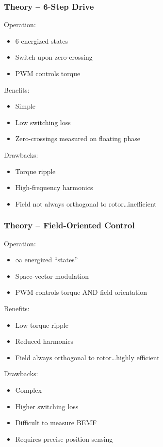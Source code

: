 \begin{frame}\frametitle{Theory -- 6-Step Drive}
	\begin{minipage}{0.6\textwidth}
		Operation:
		\begin{itemize}
			\item 6 energized states
			\item Switch upon zero-crossing
			\item PWM controls torque
		\end{itemize}
		Benefits:
		\begin{itemize}
			\item Simple
			\item Low switching loss
			\item Zero-crossings measured on floating phase
		\end{itemize}
		Drawbacks:
		\begin{itemize}
			\item Torque ripple
			\item High-frequency harmonics
			\item Field not always orthogonal to rotor\ldots inefficient
		\end{itemize}
	\end{minipage}%
	\begin{minipage}{0.4\textwidth}
		\begin{center}
			
			
		\end{center}
	\end{minipage}
\end{frame}
\begin{frame}\frametitle{Theory -- Field-Oriented Control}
	\begin{minipage}{0.6\textwidth}
		Operation:
		\begin{itemize}
			\item $\infty$ energized ``states''
			\item Space-vector modulation
			\item PWM controls torque AND field orientation
		\end{itemize}
		Benefits:
		\begin{itemize}
			\item Low torque ripple
			\item Reduced harmonics
			\item Field always orthogonal to rotor\ldots highly efficient
		\end{itemize}
		Drawbacks:
		\begin{itemize}
			\item Complex
			\item Higher switching loss
			\item Difficult to measure BEMF
			\item Requires precise position sensing
		\end{itemize}
	\end{minipage}%
	\begin{minipage}{0.4\textwidth}
		\begin{center}
			
			
		\end{center}
	\end{minipage}
\end{frame}
